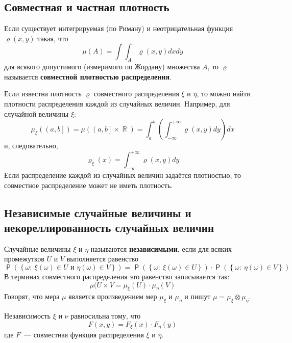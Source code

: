 \documentclass[12pt]{article}
\DeclareMathOperator{\prob}{\mathsf{P}}
\DeclareMathOperator{\RR}{\mathbb{R}}
\begin{document}
    \subsection{Совместная и частная плотность}
    Если существует интегрируемая (по Риману) и неотрицательная функция $\varrho(x, y)$ такая, что 
    \begin{equation*}
        \mu(A) = \int \int_A \varrho(x, y) dx dy
    \end{equation*}
    для всякого допустимого (измеримого по Жордану) множества $A$, то $\varrho$ называется \textbf{совместной плотностью распределения}.

    Если известна плотность $\varrho$ совместного распределения $\xi$ и $\eta$, то можно найти плотности распределения каждой из случайных величин. Например, для случайной величины $\xi$:
    \begin{equation*}
        \mu_{\xi}(\left(a, b\right]) = \mu(\left(a, b\right] \times \RR) = \int_a^b \left(\int_{-\infty}^{+\infty} \varrho(x, y) dy\right) dx
    \end{equation*}
    и, следовательно,
    \begin{equation*}
        \varrho_\xi(x) = \int_{-\infty}^{+\infty} \varrho(x,y) dy
    \end{equation*}
    Если распределение каждой из случайных величин задаётся плотностью, то совместное распределение может не иметь плотность.

    \subsection{Независимые случайные величины и некореллированность случайных величин}
    Случайные величины $\xi$ и $\eta$ называются \textbf{независимыми}, если для всяких промежутков $U$ и $V$ выполняется равенство
    \begin{equation*}
        \prob(\left\{\omega:\ \xi(\omega) \in U \text{ и } \eta(\omega) \in V\right\}) = \prob(\left\{\omega:\ \xi(\omega) \in U\right\}) \cdot \prob(\left\{\omega:\ \eta(\omega) \in V\right\})
    \end{equation*}
    В терминах совместного распределения это равенство записывается так:
    \begin{equation*}
        \mu(U \times V = \mu_\xi(U) \cdot \mu_\eta(V)
    \end{equation*}
    Говорят, что мера $\mu$ является произведением мер $\mu_\xi$ и $\mu_\eta$ и пишут $\mu = \mu_\xi \otimes \mu_\eta$.

    Независимость $\xi$ и $\nu$ равносильна тому, что
    \begin{equation*}
        F(x, y) = F_\xi(x) \cdot F_\eta(y)
    \end{equation*}
    где $F$~--- совместная функция распределения $\xi$ и $\eta$.
\end{document}
